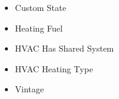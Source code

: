 \begin{itemize}
\item Custom State
\item Heating Fuel
\item HVAC Has Shared System
\item HVAC Heating Type
\item Vintage
\end{itemize}
